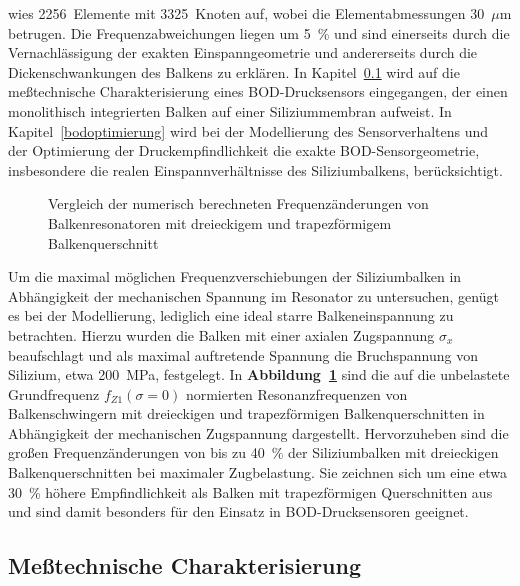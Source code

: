 wies 2256~Elemente mit 3325~Knoten auf, wobei die Elementabmessungen
30~$\mu$m betrugen. Die Frequenzabweichungen liegen um 5~\% und sind
einerseits durch die Vernachlässigung der exakten Einspanngeometrie und
andererseits durch die Dickenschwankungen des Balkens zu erklären.
In Kapitel~\ref{bodmessung} wird auf die meßtechnische Charakterisierung
eines BOD-Drucksensors eingegangen, der einen monolithisch integrierten
Balken auf einer Siliziummembran aufweist. In Kapitel~\ref{bodoptimierung}
wird bei der Modellierung des Sensorverhaltens und der Optimierung der
Druckempfindlichkeit die exakte BOD-Sensorgeometrie, insbesondere
die realen Einspannverhältnisse des Siliziumbalkens, berücksichtigt.\\
\begin{figure}[htb]

\begin{center}

\setabbsa
\end{center}
\caption{\label{abbquerschempf}
 Vergleich der numerisch berechneten Frequenzänderungen von Balkenresonatoren
 mit dreieckigem und trapezförmigem Balkenquerschnitt}
\end{figure}
Um die maximal möglichen Frequenzverschiebungen der Siliziumbalken in
Abhängigkeit der mechanischen Spannung im Resonator zu untersuchen,
genügt es bei der Modellierung, lediglich eine ideal starre
Balkeneinspannung
zu betrachten. Hierzu wurden die Balken mit einer axialen Zugspannung
$\sigma_{x}$ beaufschlagt und als maximal auftretende Spannung die
Bruchspannung von Silizium, etwa 200~MPa, festgelegt.
In {\bf Abbildung~\ref{abbquerschempf}} sind die auf die unbelastete
Grundfrequenz $f_{Z1}(\sigma=0)$ normierten Resonanzfrequenzen von
Balkenschwingern mit dreieckigen und trapezförmigen Balkenquerschnitten in
Abhängigkeit der mechanischen Zugspannung dargestellt. Hervorzuheben sind die
großen Frequenzänderungen von bis zu 40~\% der Siliziumbalken mit dreieckigen
Balkenquerschnitten bei maximaler Zugbelastung. Sie zeichnen sich um eine
etwa 30~\% höhere Empfindlichkeit als Balken mit trapezförmigen
Querschnitten aus und sind damit besonders für den Einsatz in
BOD-Drucksensoren geeignet.




\subsection{Meßtechnische Charakterisierung}
\label{bodmessung}


